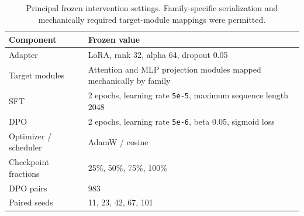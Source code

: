 \begin{table}[t]
\centering
\caption{Principal frozen intervention settings. Family-specific serialization and mechanically required target-module mappings were permitted.}
\label{tab:intervention}
\footnotesize
\begin{tabularx}{\textwidth}{@{}p{}X@{}}
\toprule
\textbf{Component} & \textbf{Frozen value} \\
\midrule
Adapter & LoRA, rank 32, alpha 64, dropout 0.05 \\
Target modules & Attention and MLP projection modules mapped mechanically by family \\
SFT & 2 epochs, learning rate \texttt{5e-5}, maximum sequence length 2048 \\
DPO & 2 epochs, learning rate \texttt{5e-6}, beta 0.05, sigmoid loss \\
Optimizer / scheduler & AdamW / cosine \\
Checkpoint fractions & 25\%, 50\%, 75\%, 100\% \\
DPO pairs & 983 \\
Paired seeds & 11, 23, 42, 67, 101 \\
\bottomrule
\end{tabularx}
\end{table}
